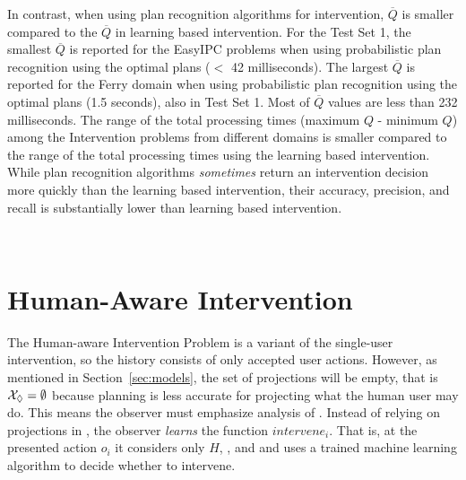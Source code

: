 In contrast, when using plan recognition algorithms for intervention, $\overline{Q}$ is smaller compared to the $\overline{Q}$ in learning based intervention.
For the Test Set 1, the smallest $\overline{Q}$ is reported for the EasyIPC problems when using probabilistic plan recognition using the optimal plans ($<$ 42 milliseconds).
The largest $\overline{Q}$ is reported for the Ferry domain when using probabilistic plan recognition using the optimal plans (1.5 seconds), also in Test Set 1.
Most of $\overline{Q}$ values are less than 232 milliseconds.
The range of the total processing times (maximum $Q$ - minimum $Q$) among the Intervention problems from different domains is smaller compared to the range of the total processing times using the learning based intervention.
While plan recognition algorithms \emph{sometimes} return an intervention decision more quickly than the learning based intervention,  their accuracy, precision, and recall is substantially lower than learning based intervention.

~\section{Human-Aware Intervention}
\label{sec:human-aware}
The Human-aware Intervention Problem is a variant of the single-user intervention, so the history \historyDef consists of only accepted user actions.
However, as mentioned in Section~\ref{sec:models}, the set of projections will be empty, that is $\mathcal{X}_\Diamond = \emptyset$ because planning is less accurate for projecting what the human user may do.
This means the observer must emphasize analysis of \historyDef.
Instead of relying on projections in \Suffixes, the observer \emph{learns} the function $intervene_i$.
That is, at the presented action $o_i$ it considers only $H$, \desired, and \undesired and uses a trained machine learning algorithm to decide whether to intervene.

